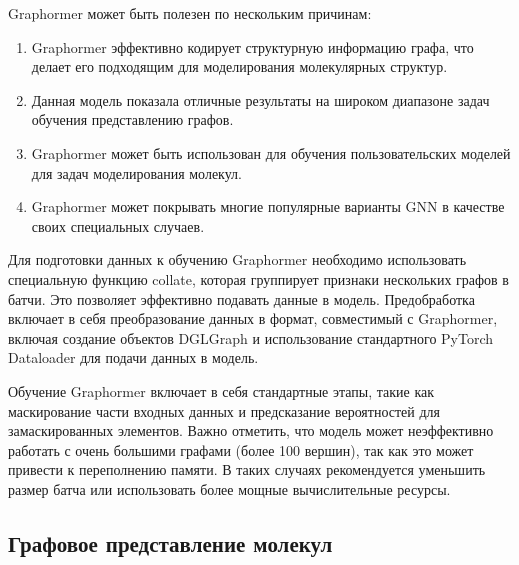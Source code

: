 Graphormer может быть полезен по нескольким причинам:
\begin{enumerate}
    \item Graphormer эффективно кодирует структурную информацию графа, что делает его подходящим для моделирования молекулярных структур.
    \item Данная модель показала отличные результаты на широком диапазоне задач обучения представлению графов.
    \item Graphormer может быть использован для обучения пользовательских моделей для задач моделирования молекул.
    \item Graphormer может покрывать многие популярные варианты GNN в качестве своих специальных случаев.
\end{enumerate}

Для подготовки данных к обучению Graphormer необходимо использовать специальную функцию collate, которая группирует признаки нескольких графов в батчи. Это позволяет эффективно подавать данные в модель. Предобработка включает в себя преобразование данных в формат, совместимый с Graphormer, включая создание объектов DGLGraph и использование стандартного PyTorch Dataloader для подачи данных в модель.

Обучение Graphormer включает в себя стандартные этапы, такие как маскирование части входных данных и предсказание вероятностей для замаскированных элементов. Важно отметить, что модель может неэффективно работать с очень большими графами (более 100 вершин), так как это может привести к переполнению памяти. В таких случаях рекомендуется уменьшить размер батча или использовать более мощные вычислительные ресурсы.



\subsection{Графовое представление молекул}

